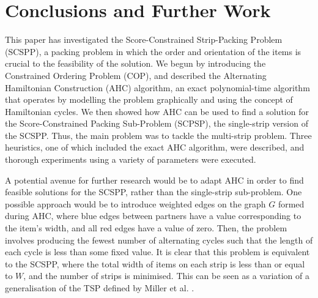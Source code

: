 \documentclass[runningheads]{llncs}
\begin{document}
\section{Conclusions and Further Work}
\label{sec:conclusion}
This paper has investigated the Score-Constrained Strip-Packing Problem (SCSPP), a packing problem in which the order and orientation of the items is crucial to the feasibility of the solution. We begun by introducing the Constrained Ordering Problem (COP), and described the Alternating Hamiltonian Construction (AHC) algorithm, an exact polynomial-time algorithm that operates by modelling the problem graphically and using the concept of Hamiltonian cycles. We then showed how AHC can be used to find a solution for the Score-Constrained Packing Sub-Problem (SCPSP), the single-strip version of the SCSPP. Thus, the main problem was to tackle the multi-strip problem. Three heuristics, one of which included the exact AHC algorithm, were described, and thorough experiments using a variety of parameters were executed. 

A potential avenue for further research would be to adapt AHC in order to find feasible solutions for the SCSPP, rather than the single-strip sub-problem. One possible approach would be to introduce weighted edges on the graph $G$ formed during AHC, where blue edges between partners have a value corresponding to the item's width, and all red edges have a value of zero. Then, the problem involves producing the fewest number of alternating cycles such that the length of each cycle is less than some fixed value. It is clear that this problem is equivalent to the SCSPP, where the total width of items on each strip is less than or equal to $W$, and the number of strips is minimised. This can be seen as a variation of a generalisation of the TSP defined by Miller et al. \cite{miller1960}.
\end{document}
